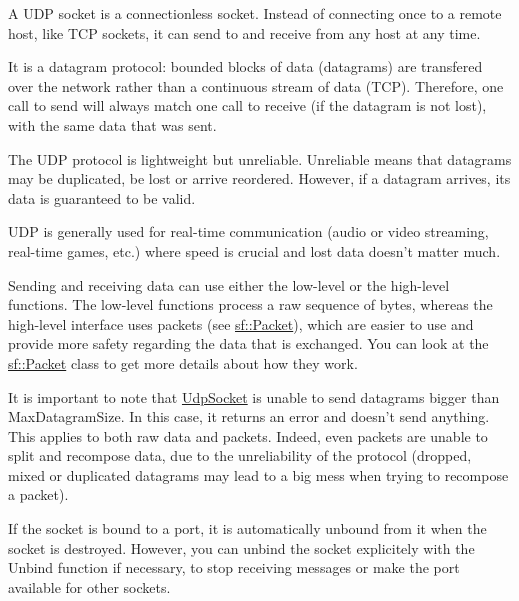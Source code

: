 A U\-D\-P socket is a connectionless socket. Instead of connecting once to a remote host, like T\-C\-P sockets, it can send to and receive from any host at any time.

It is a datagram protocol\-: bounded blocks of data (datagrams) are transfered over the network rather than a continuous stream of data (T\-C\-P). Therefore, one call to send will always match one call to receive (if the datagram is not lost), with the same data that was sent.

The U\-D\-P protocol is lightweight but unreliable. Unreliable means that datagrams may be duplicated, be lost or arrive reordered. However, if a datagram arrives, its data is guaranteed to be valid.

U\-D\-P is generally used for real-\/time communication (audio or video streaming, real-\/time games, etc.) where speed is crucial and lost data doesn't matter much.

Sending and receiving data can use either the low-\/level or the high-\/level functions. The low-\/level functions process a raw sequence of bytes, whereas the high-\/level interface uses packets (see \hyperlink{classsf_1_1_packet}{sf\-::\-Packet}), which are easier to use and provide more safety regarding the data that is exchanged. You can look at the \hyperlink{classsf_1_1_packet}{sf\-::\-Packet} class to get more details about how they work.

It is important to note that \hyperlink{classsf_1_1_udp_socket}{Udp\-Socket} is unable to send datagrams bigger than Max\-Datagram\-Size. In this case, it returns an error and doesn't send anything. This applies to both raw data and packets. Indeed, even packets are unable to split and recompose data, due to the unreliability of the protocol (dropped, mixed or duplicated datagrams may lead to a big mess when trying to recompose a packet).

If the socket is bound to a port, it is automatically unbound from it when the socket is destroyed. However, you can unbind the socket explicitely with the Unbind function if necessary, to stop receiving messages or make the port available for other sockets.

